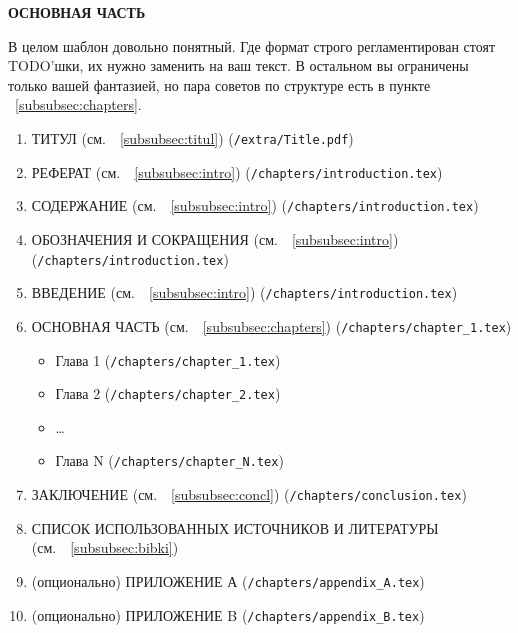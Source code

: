 \newpage

{\centering
\normal
\textbf{ОСНОВНАЯ ЧАСТЬ}\par
}



В целом шаблон довольно понятный.
Где формат строго регламентирован стоят TODO'шки, их нужно заменить на ваш текст.
В остальном вы ограничены только вашей фантазией, но пара советов по структуре есть в пункте ~\ref{subsubsec:chapters}.

\begin{enumerate}
    \item ТИТУЛ (см.\ ~\ref{subsubsec:titul}) (\texttt{/extra/Title.pdf})
    \item РЕФЕРАТ (см.\ ~\ref{subsubsec:intro}) (\texttt{/chapters/introduction.tex})
    \item СОДЕРЖАНИЕ (см.\ ~\ref{subsubsec:intro}) (\texttt{/chapters/introduction.tex})
    \item ОБОЗНАЧЕНИЯ И СОКРАЩЕНИЯ (см.\ ~\ref{subsubsec:intro}) (\texttt{/chapters/introduction.tex})
    \item ВВЕДЕНИЕ (см.\ ~\ref{subsubsec:intro}) (\texttt{/chapters/introduction.tex})
    \item ОСНОВНАЯ ЧАСТЬ (см.\ ~\ref{subsubsec:chapters}) (\texttt{/chapters/chapter\_1.tex})
    \begin{itemize}
        \item Глава 1 (\texttt{/chapters/chapter\_1.tex})
        \item Глава 2 (\texttt{/chapters/chapter\_2.tex})
        \item \ldots
        \item Глава N (\texttt{/chapters/chapter\_N.tex})
    \end{itemize}
    \item ЗАКЛЮЧЕНИЕ (см.\ ~\ref{subsubsec:concl}) (\texttt{/chapters/conclusion.tex})
    \item СПИСОК ИСПОЛЬЗОВАННЫХ ИСТОЧНИКОВ И ЛИТЕРАТУРЫ (см.\ ~\ref{subsubsec:bibki})
    \item (опционально) ПРИЛОЖЕНИЕ А (\texttt{/chapters/appendix\_A.tex})
    \item (опционально) ПРИЛОЖЕНИЕ B (\texttt{/chapters/appendix\_B.tex})
\end{enumerate}

